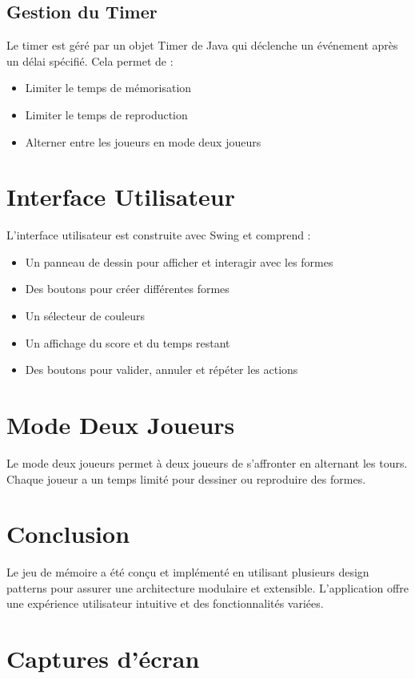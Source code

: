 \documentclass[11pt,a4paper]{article}
\begin{document}
\subsection{Gestion du Timer}
Le timer est géré par un objet Timer de Java qui déclenche un événement après un délai spécifié. Cela permet de :
\begin{itemize}
    \item Limiter le temps de mémorisation
    \item Limiter le temps de reproduction
    \item Alterner entre les joueurs en mode deux joueurs
\end{itemize}

\section{Interface Utilisateur}
L'interface utilisateur est construite avec Swing et comprend :
\begin{itemize}
    \item Un panneau de dessin pour afficher et interagir avec les formes
    \item Des boutons pour créer différentes formes
    \item Un sélecteur de couleurs
    \item Un affichage du score et du temps restant
    \item Des boutons pour valider, annuler et répéter les actions
\end{itemize}

\section{Mode Deux Joueurs}
Le mode deux joueurs permet à deux joueurs de s'affronter en alternant les tours. Chaque joueur a un temps limité pour dessiner ou reproduire des formes.

\section{Conclusion}
Le jeu de mémoire a été conçu et implémenté en utilisant plusieurs design patterns pour assurer une architecture modulaire et extensible. L'application offre une expérience utilisateur intuitive et des fonctionnalités variées.

\appendix
\section{Captures d'écran}
\end{document}
